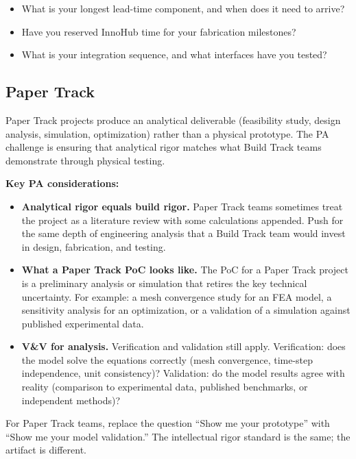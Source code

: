 \begin{paquestion}
\begin{itemize}[nosep,leftmargin=1.5em]
\item What is your longest lead-time component, and when does it need to arrive?
\item Have you reserved InnoHub time for your fabrication milestones?
\item What is your integration sequence, and what interfaces have you tested?
\end{itemize}
\end{paquestion}

\subsection{Paper Track}

Paper Track projects produce an analytical deliverable (feasibility study, design analysis, simulation, optimization) rather than a physical prototype. The PA challenge is ensuring that analytical rigor matches what Build Track teams demonstrate through physical testing.

\textbf{Key PA considerations:}

\begin{itemize}[nosep,leftmargin=1.5em]
\item \textbf{Analytical rigor equals build rigor.} Paper Track teams sometimes treat the project as a literature review with some calculations appended. Push for the same depth of engineering analysis that a Build Track team would invest in design, fabrication, and testing.

\item \textbf{What a Paper Track PoC looks like.} The PoC for a Paper Track project is a preliminary analysis or simulation that retires the key technical uncertainty. For example: a mesh convergence study for an FEA model, a sensitivity analysis for an optimization, or a validation of a simulation against published experimental data.

\item \textbf{V\&V for analysis.} Verification and validation still apply. Verification: does the model solve the equations correctly (mesh convergence, time-step independence, unit consistency)? Validation: do the model results agree with reality (comparison to experimental data, published benchmarks, or independent methods)?
\end{itemize}

\begin{bestpractice}
For Paper Track teams, replace the question ``Show me your prototype'' with ``Show me your model validation.'' The intellectual rigor standard is the same; the artifact is different.
\end{bestpractice}

